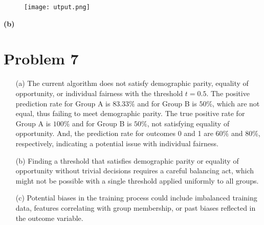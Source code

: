 \documentclass{article}
\begin{document}
    \begin{figure}
        \centering
        \texttt{[image: utput.png]}
        \label{fig:enter-label}
    \end{figure}
    
\textbf{(b)}
\newpage

\section*{Problem 7}
\begin{enumerate}
    \item[(a)] The current algorithm does not satisfy demographic parity, equality of opportunity, or individual fairness with the threshold \( t = 0.5 \). The positive prediction rate for Group A is \(83.33\%\) and for Group B is \(50\%\), which are not equal, thus failing to meet demographic parity. The true positive rate for Group A is \(100\%\) and for Group B is \(50\%\), not satisfying equality of opportunity. And, the prediction rate for outcomes 0 and 1 are \(60\%\) and \(80\%\), respectively, indicating a potential issue with individual fairness.

    \item[(b)] Finding a threshold that satisfies demographic parity or equality of opportunity without trivial decisions requires a careful balancing act, which might not be possible with a single threshold applied uniformly to all groups.

    \item[(c)] Potential biases in the training process could include imbalanced training data, features correlating with group membership, or past biases reflected in the outcome variable.
\end{enumerate}
\end{document}
